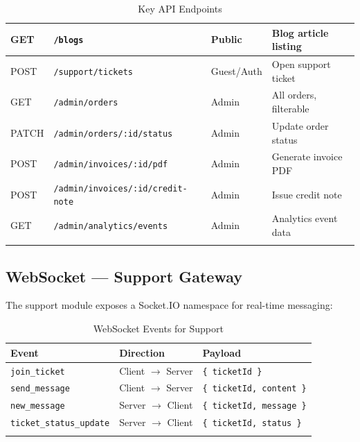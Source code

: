 \begin{longtable}{|m{1.5cm}|m{4.5cm}|m{2cm}|m{6cm}|}
    \hline
    GET             & \texttt{/blogs}                          & Public        & Blog article listing                  \\
    \hline
    POST            & \texttt{/support/tickets}                & Guest/Auth    & Open support ticket                   \\
    \hline
    GET             & \texttt{/admin/orders}                   & Admin         & All orders, filterable                \\
    \hline
    PATCH           & \texttt{/admin/orders/:id/status}        & Admin         & Update order status                   \\
    \hline
    POST            & \texttt{/admin/invoices/:id/pdf}         & Admin         & Generate invoice PDF                  \\
    \hline
    POST            & \texttt{/admin/invoices/:id/credit-note} & Admin         & Issue credit note                     \\
    \hline
    GET             & \texttt{/admin/analytics/events}         & Admin         & Analytics event data                  \\
    \hline
    \caption{Key API Endpoints}
    \label{tab:api_endpoints}
\end{longtable}

\subsection{WebSocket — Support Gateway}

The support module exposes a Socket.IO namespace for real-time messaging:

\begin{longtable}{|m{3.5cm}|m{3cm}|m{7.5cm}|}
    \hline
    \textbf{Event}                  & \textbf{Direction}          & \textbf{Payload}                 \\
    \hline
    \endhead
    \endfoot
    \endlastfoot
    \hline
    \texttt{join\_ticket}           & Client $\rightarrow$ Server & \texttt{\{ ticketId \}}          \\
    \hline
    \texttt{send\_message}          & Client $\rightarrow$ Server & \texttt{\{ ticketId, content \}} \\
    \hline
    \texttt{new\_message}           & Server $\rightarrow$ Client & \texttt{\{ ticketId, message \}} \\
    \hline
    \texttt{ticket\_status\_update} & Server $\rightarrow$ Client & \texttt{\{ ticketId, status \}}  \\
    \hline
    \caption{WebSocket Events for Support}
    \label{tab:ws_events}
\end{longtable}

